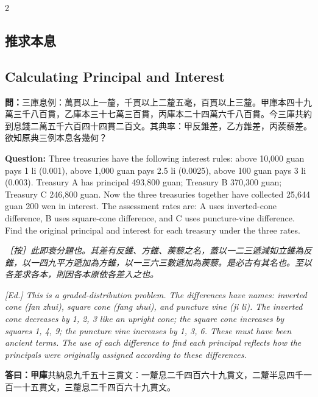 \documentclass[11pt,a4paper]{article}
\newcommand{\QuestionText}[1]{\par\noindent\textbf{\color{problemcolor}問：}#1\par}
\newcommand{\AnswerText}[1]{\par\noindent\textbf{\color{answercolor}答曰：}#1\par}
\newcommand{\EdNoteText}[1]{\par\noindent\textit{\color{ednotecolor}［按］#1}\par}
\newcommand{\QuestionEn}[1]{\par\noindent\textbf{\color{problemcolor}Question:} #1\par}
\newcommand{\EdNoteEn}[1]{\par\noindent\textit{\color{ednotecolor}[Ed.] #1}\par}
\begin{document}
\begin{paracol}{2}

\subsection*{\color{sectioncolor}推求本息}
\switchcolumn
\subsection*{\color{sectioncolor}Calculating Principal and Interest}
\switchcolumn*

\QuestionText{三庫息例：萬貫以上一釐，千貫以上二釐五毫，百貫以上三釐。甲庫本四十九萬三千八百貫，乙庫本三十七萬三百貫，丙庫本二十四萬六千八百貫。今三庫共約到息錢二萬五千六百四十四貫二百文。其典率：甲反錐差，乙方錐差，丙蒺藜差。欲知原典三例本息各幾何？}
\switchcolumn
\QuestionEn{Three treasuries have the following interest rules: above 10,000 guan pays 1 li (0.001), above 1,000 guan pays 2.5 li (0.0025), above 100 guan pays 3 li (0.003). Treasury A has principal 493,800 guan; Treasury B 370,300 guan; Treasury C 246,800 guan. Now the three treasuries together have collected 25,644 guan 200 wen in interest. The assessment rates are: A uses inverted-cone difference, B uses square-cone difference, and C uses puncture-vine difference. Find the original principal and interest for each treasury under the three rates.}
\switchcolumn*

\EdNoteText{此即衰分題也。其差有反錐、方錐、蒺藜之名，蓋以一二三遞減如立錐為反錐，以一四九平方遞加為方錐，以一三六三數遞加為蒺藜。是必古有其名也。至以各差求各本，則因各本原依各差入之也。}
\switchcolumn
\EdNoteEn{This is a graded-distribution problem. The differences have names: inverted cone (fan zhui), square cone (fang zhui), and puncture vine (ji li). The inverted cone decreases by 1, 2, 3 like an upright cone; the square cone increases by squares 1, 4, 9; the puncture vine increases by 1, 3, 6. These must have been ancient terms. The use of each difference to find each principal reflects how the principals were originally assigned according to these differences.}
\switchcolumn*

\AnswerText{\textbf{甲庫}共納息九千五十三貫文：一釐息二千四百六十九貫文，二釐半息四千一百一十五貫文，三釐息二千四百六十九貫文。

}
\end{paracol}
\end{document}
